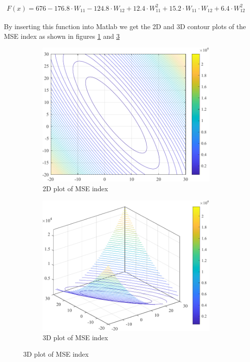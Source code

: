 \[
F(x) = 676 -176.8 \cdot W_{11} - 124.8 \cdot W_{12} + 12.4 \cdot W_{11}^2 + 15.2 \cdot W_{11}\cdot W_{12} + 6.4 \cdot W_{12}^2
\]\\


By inserting this function into Matlab we get the 2D and 3D contour plots of the MSE index
as shown in figures \ref{fig:prob_8_2d} and \ref{fig:prob_8_3d}\\
\begin{figure}[H]
	\centering
	\begin{subfigure}{0.47\textwidth}
		\centering
		\includegraphics[width=\textwidth]{../Problem 8/contour_2d.pdf}
		\caption{2D plot of MSE index}
		\label{fig:prob_8_2d}
	\end{subfigure}
	\hspace{2mm}
	\begin{subfigure}{0.47\textwidth}
		\centering
		\includegraphics[width=\textwidth]{../Problem 8/contour_3d.pdf}
		\caption{3D plot of MSE index}
		\label{fig:prob_8_3d}
	\end{subfigure}	
\end{figure}

